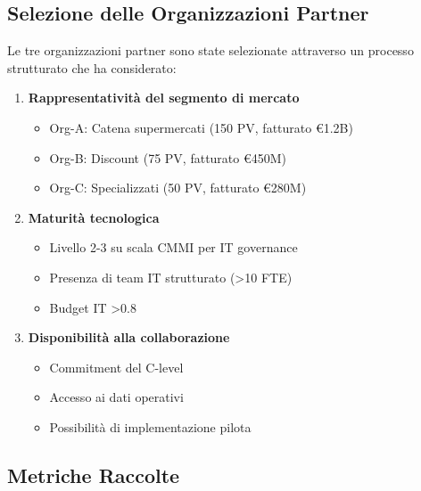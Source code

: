 \subsection{\texorpdfstring{Selezione delle Organizzazioni Partner}{A.2.1 - Selezione delle Organizzazioni Partner}}

Le tre organizzazioni partner sono state selezionate attraverso un processo strutturato che ha considerato:

\begin{enumerate}
    \item \textbf{Rappresentatività del segmento di mercato}
    \begin{itemize}
        \item Org-A: Catena supermercati (150 PV, fatturato €1.2B)
        \item Org-B: Discount (75 PV, fatturato €450M)
        \item Org-C: Specializzati (50 PV, fatturato €280M)
    \end{itemize}
    
    \item \textbf{Maturità tecnologica}
    \begin{itemize}
        \item Livello 2-3 su scala CMMI per IT governance
        \item Presenza di team IT strutturato (>10 FTE)
        \item Budget IT >0.8%
    \end{itemize}
    
    \item \textbf{Disponibilità alla collaborazione}
    \begin{itemize}
        \item Commitment del C-level
        \item Accesso ai dati operativi
        \item Possibilità di implementazione pilota
    \end{itemize}
\end{enumerate}

\subsection{\texorpdfstring{Metriche Raccolte}{A.2.2 - Metriche Raccolte}}

